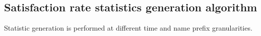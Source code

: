 \subsection{Satisfaction rate statistics generation algorithm}
\label{sec:stats}

Statistic generation is performed at different time and name prefix granularities.  






